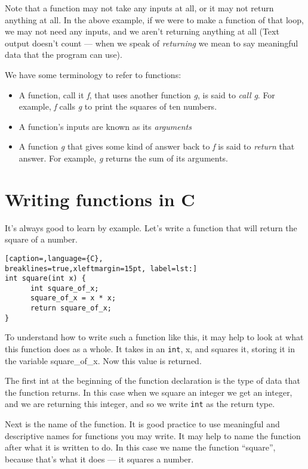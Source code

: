 Note that a function may not take any inputs at all, or it may not return
anything at all. In the above example, if we were to make a function of that
loop, we may not need any inputs, and we aren't returning anything at all (Text
output doesn't count --- when we speak of \emph{returning} we mean to say
meaningful data that the program can use).

We have some terminology to refer to functions:
\begin{itemize}
\setlength{\itemsep}{0cm}
\setlength{\parskip}{0cm}
	\item A function, call it \emph{f}, that uses another function \emph{g}, is
said to \emph{call} \emph{g}. For example, \emph{f} calls \emph{g} to print the
squares of ten numbers.
	\item A function's inputs are known as its \emph{arguments}
	\item A function \emph{g} that gives some kind of answer back to \emph{f}
is said to \emph{return} that answer. For example, \emph{g} returns the sum of
its arguments.
\end{itemize}

\section{Writing functions in C}
It's always good to learn by example. Let's write a function that will return the square of a number.

\lstset{basicstyle=\scriptsize, numbers=left, captionpos=b, tabsize=4}
\begin{lstlisting}[caption=,language={C},
breaklines=true,xleftmargin=15pt, label=lst:]
int square(int x) {
	  int square_of_x;
	  square_of_x = x * x;
	  return square_of_x;
}
\end{lstlisting}

To understand how to write such a function like this, it may help to look at
what this function does as a whole. It takes in an \texttt{int}, x, and squares
it, storing it in the variable square\_of\_x. Now this value is returned. 

The first int at the beginning of the function declaration is the type of data
that the function returns. In this case when we square an integer we get an
integer, and we are returning this integer, and so we write \texttt{int} as the
return type.

Next is the name of the function. It is good practice to use meaningful and
descriptive names for functions you may write. It may help to name the function
after what it is written to do. In this case we name the function ``square'',
because that's what it does --- it squares a number.

